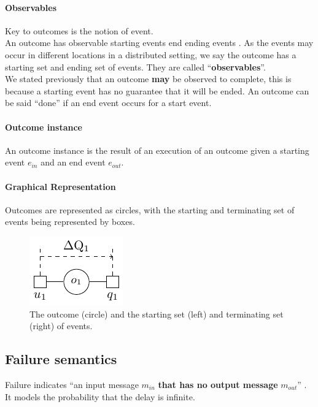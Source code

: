      \paragraph{Observables}
     Key to outcomes is the notion of event. \\
     An outcome has observable starting events end ending events \cite{dq-tut}. As the events may occur in different locations in a distributed setting, we say the outcome has a starting set and ending set of events. They are called ``\textbf{observables}''. \cite{myo}\\
     We stated previously that an outcome \textbf{may} be observed to complete, this is because a starting event has no guarantee that it will be ended. An outcome can be said ``done'' if an end event occurs for a start event.

    \paragraph{Outcome instance}
    An outcome instance is the result of an execution of an outcome given a starting event $e_{in}$ and an end event $e_{out}$. \cite{art}

    \paragraph{Graphical Representation}
    Outcomes are represented as circles, with the starting and terminating set of events being represented by boxes. \cite{myo}
    \begin{figure}[H]
        \begin{center}
            \includegraphics[scale=1.2]{tikz/outdq.pdf}
        \end{center}
        \caption{The outcome (circle) and the starting set (left) and terminating set (right) of events.}
    \end{figure}
   
  \subsection{Failure semantics} \label{subsec:failure}
       Failure indicates ``an input message $m_{in}$ \textbf{that has no output message} $m_{out}$'' \cite{art}. It models the probability that the delay is infinite.



